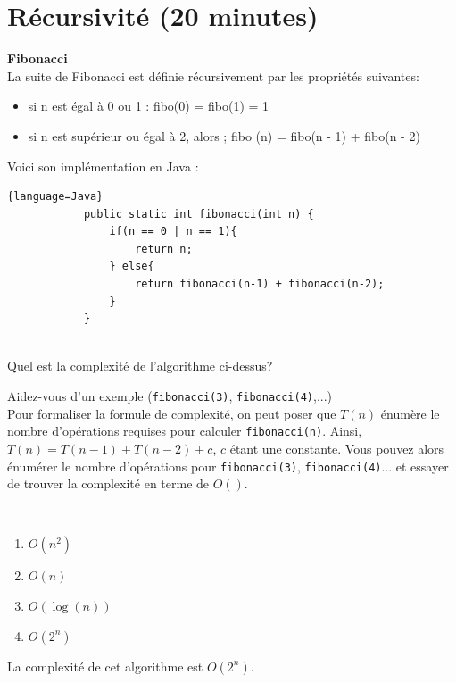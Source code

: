 \section{Récursivité (20 minutes) }
\begin{Exercice} [5 minutes] \textbf{Fibonacci}\\
\label{exercice:1}
    La suite de Fibonacci est définie récursivement par les propriétés suivantes:
    \begin{itemize}
        \item si n est égal à 0 ou 1 : fibo(0) = fibo(1) = 1
        \item si n est supérieur ou égal à 2, alors ; fibo (n) = fibo(n - 1) + fibo(n - 2)
    \end{itemize}
    
    Voici son implémentation en Java :
    
    \begin{lstlisting}{language=Java}
            public static int fibonacci(int n) {
                if(n == 0 | n == 1){
                    return n;
                } else{
                    return fibonacci(n-1) + fibonacci(n-2);
                }
            }
            
    \end{lstlisting}
    
    Quel est la complexité de l'algorithme ci-dessus?
    
    \begin{conseil}
    Aidez-vous d'un exemple (\lstinline{fibonacci(3)}, \lstinline{fibonacci(4)},...) \\
    Pour formaliser la formule de complexité, on peut poser que $T(n)$ énumère le nombre d'opérations requises pour calculer \lstinline{fibonacci(n)}. Ainsi, $T(n) = T(n-1) + T(n-2) + c$, $c$ étant une constante. Vous pouvez alors énumérer le nombre d'opérations pour \lstinline{fibonacci(3)}, \lstinline{fibonacci(4)}... et essayer de trouver la complexité en terme de $O()$.
    \end{conseil}
    
    \ \\
    
    \begin{enumerate}
        \item $O(n^2)$
        \item $O(n)$
        \item $O(\log(n))$
        \item $O(2^n)$
    \end{enumerate}
    
    \begin{solution}
        La complexité de cet algorithme est $O(2^n)$.
    \end{solution}
\end{Exercice}

